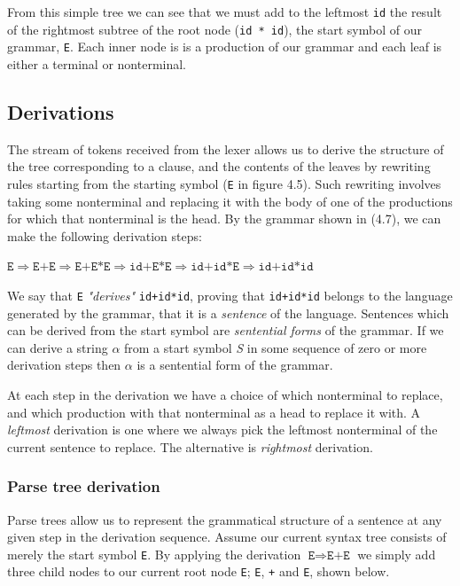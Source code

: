 \documentclass[a4paper, 11pt]{article}
\begin{document}
From this simple tree we can see that we must add to the leftmost \texttt{id} the result of the rightmost subtree of the root node (\texttt{id * id}), the start symbol of our grammar, \texttt{E}. Each inner node is is a production of our grammar and each leaf is either a terminal or nonterminal.

\subsection{Derivations}
The stream of tokens received from the lexer allows us to derive the structure of the tree corresponding to a clause, and the contents of the leaves by rewriting rules starting from the starting symbol (\texttt{E} in figure 4.5). Such rewriting involves taking some nonterminal and replacing it with the body of one of the productions for which that nonterminal is the head. By the grammar shown in (4.7), we can make the following derivation steps: 
\begin{center}
$\texttt{E} \Rightarrow \texttt{E+E} \Rightarrow \texttt{E+E*E} \Rightarrow \texttt{id+E*E} \Rightarrow \texttt{id+id*E} \Rightarrow \texttt{id+id*id}$
\end{center}
We say that \texttt{E} \textit{"derives"} \texttt{id+id*id}, proving that \texttt{id+id*id} belongs to the language generated by the grammar, that it is a \textit{sentence} of the language. Sentences which can be derived from the start symbol are \textit{sentential forms} of the grammar. If we can derive a string $\alpha$ from a start symbol \textit{S} in some sequence of zero or more derivation steps then $\alpha$ is a sentential form of the grammar.

At each step in the derivation we have a choice of which nonterminal to replace, and which production with that nonterminal as a head to replace it with. A \textit{leftmost} derivation is one where we always pick the leftmost nonterminal of the current sentence to replace. The alternative is \textit{rightmost} derivation.

\subsubsection{Parse tree derivation}
Parse trees allow us to represent the grammatical structure of a sentence at any given step in the derivation sequence. Assume our current syntax tree consists of merely the start symbol \texttt{E}. By applying the derivation $\texttt{E} \Rightarrow \texttt{E+E}$ we simply add three child nodes to our current root node \texttt{E}; \texttt{E}, \texttt{+} and \texttt{E}, shown below.
\end{document}
